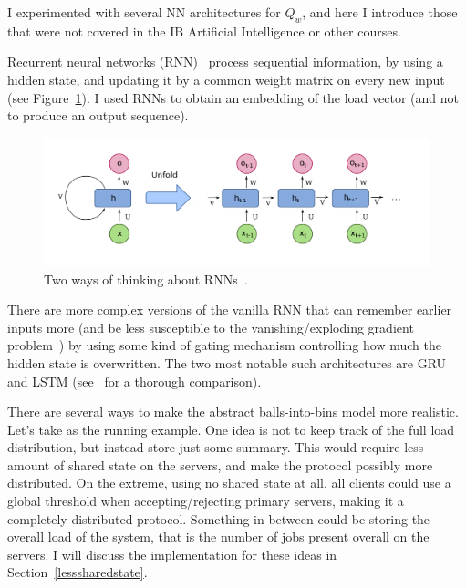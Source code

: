 I experimented with several NN architectures for $Q_w$, and here I introduce those that were not covered in the IB Artificial Intelligence or other courses.

Recurrent neural networks (RNN)~\cite{hopfield1982RNNoriginal} process sequential information, by using a hidden state, and updating it by a common weight matrix on every new input (see Figure~\ref{RNN-image}). I used RNNs to obtain an embedding of the load vector (and not to produce an output sequence).

\begin{figure}[h]
    \centering
    \includegraphics[scale=0.2]{Chapter2/Figs/RNN.png}
    \caption{Two ways of thinking about RNNs~\cite{RNN}.}
     \label{RNN-image}
\end{figure}


\iffalse


There are more complex versions of the vanilla RNN that can remember earlier inputs more (and be less susceptible to the vanishing/exploding gradient problem~\cite{noh2021rnnvanishinggradient}) by using some kind of gating mechanism controlling how much the hidden state is overwritten. The two most notable such architectures are GRU and LSTM (see~\cite{shewalkar2019rnngrulstm} for a thorough comparison).


There are several ways to make the abstract balls-into-bins model more realistic. Let's take \TwoThinning as the running example. One idea is not to keep track of the full load distribution, but instead store just some summary. This would require less amount of shared state on the servers, and make the protocol possibly more distributed. On the extreme, using no shared state at all, all clients could use a global threshold when accepting/rejecting primary servers, making it a completely distributed protocol. Something in-between could be storing the overall load of the system, that is the number of jobs present overall on the servers. I will discuss the implementation for these ideas in Section~\ref{lesssharedstate}.


